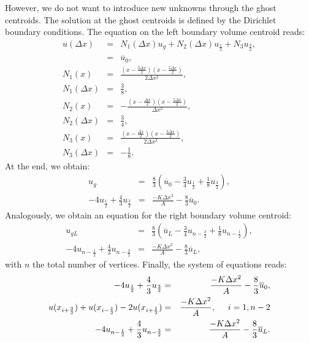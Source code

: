 \documentclass[a4paper,12pt]{article}
\begin{document}
However, we do not want to introduce new unknowns through the ghost centroids. The solution at the ghost centroids is defined by the Dirichlet boundary conditions.
The equation on the left boundary volume centroid reads:
\begin{eqnarray}
u(\Delta x) &=& N_1(\Delta x)u_g + N_2(\Delta x)u_{\frac{1}{2}} + N_3u_{\frac{3}{2}},\\
&=& \overline{u}_0,\\
N_1(x) &=& \frac{(x-\frac{3\Delta x}{2})(x - \frac{5\Delta x}{2})}{2\Delta x^2},\\
N_1(\Delta x) &=& \frac{3}{8},\\
N_2(x) &=& -\frac{(x-\frac{\Delta x}{2})(x - \frac{5\Delta x}{2})}{\Delta x^2},\\
N_2(\Delta x) &=& \frac{3}{4},\\
N_3(x) &=& \frac{(x-\frac{\Delta x}{2})(x - \frac{3\Delta x}{2})}{2\Delta x^2},\\
N_3(\Delta x) &=& -\frac{1}{8}.
\end{eqnarray}
At the end, we obtain:
\begin{eqnarray}
u_g &=& \frac{8}{3}(\overline{u}_0 -\frac{3}{4}u_{\frac{1}{2}} + \frac{1}{8} u_{\frac{3}{2}}),\\
-4 u_{\frac{1}{2}} + \frac{4}{3}u_{\frac{3}{2}} &=& \frac{-K\Delta x^2}{A} - \frac{8}{3}\overline{u}_0.
\end{eqnarray}
Analogously, we obtain an equation for the right boundary volume centroid:
\begin{eqnarray}
u_{gL} &=& \frac{8}{3}(\overline{u}_L -\frac{3}{4}u_{n-\frac{3}{2}} + \frac{1}{8} u_{n-\frac{1}{2}}),\\
-4 u_{n-\frac{1}{2}} + \frac{4}{3}u_{n-\frac{3}{2}} &=& \frac{-K\Delta x^2}{A} - \frac{8}{3}\overline{u}_L,
\end{eqnarray}
with $n$ the total number of vertices.
Finally, the system of equations reads:
\begin{eqnarray}
-4 u_{\frac{1}{2}} + \frac{4}{3}u_{\frac{3}{2}} &=& \frac{-K\Delta x^2}{A} - \frac{8}{3}\overline{u}_0,\\
u(x_{i+\frac{3}{2}})+u(x_{i-\frac{1}{2}})-2u(x_{i+\frac{1}{2}}) &=& \frac{-K\Delta x^2}{A},\hspace*{0.5cm} i=1,n-2\\
-4 u_{n-\frac{1}{2}} + \frac{4}{3}u_{n-\frac{3}{2}} &=& \frac{-K\Delta x^2}{A} - \frac{8}{3}\overline{u}_L.
\end{eqnarray}
\end{document}

